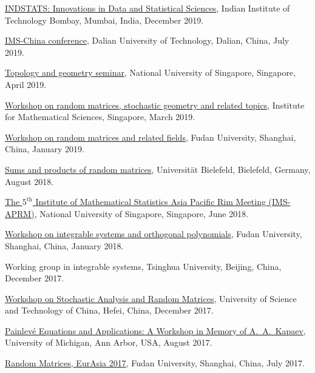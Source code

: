 \documentclass[12pt,a4paper]{article}
\newenvironment{item_list}{
 \begin{list}{}{
   \setlength{\leftmargin}{1.5em}
   \setlength{\itemsep}{0.25em}
   \setlength{\parskip}{0pt}
   \setlength{\parsep}{0.25em}
 }
}{
 \end{list}
}
\begin{document}
\begin{item_list}
\item
  \href{https://www.intindstat.org/iisaconference2019/}{INDSTATS: Innovations in Data and Statistical Sciences}, Indian Institute of Technology Bombay, Mumbai, India, December 2019.
\item
  \href{http://www.ims-china.org/}{IMS-China conference}, Dalian University of Technology, Dalian, China, July 2019.
\item
  \href{http://ww1.math.nus.edu.sg/seminars.aspx?CatID=5}{Topology and geometry seminar}, National University of Singapore, Singapore, April 2019.
\item
  \href{https://sites.google.com/view/randommatrices2019nus}{Workshop on random matrices, stochastic geometry and related topics}, Institute for Mathematical Sciences, Singapore, March 2019.
\item
  \href{http://math.fudan.edu.cn/show.aspx?info_lb=766&flag=527&info_id=6117}{Workshop on random matrices and related fields}, Fudan University, Shanghai, China, January 2019.
\item
  \href{https://www.uni-bielefeld.de/(en)/ZiF/AG/2018/08-27-Akemann.html}{Sums and products of random matrices}, Universit\"{a}t Bielefeld, Bielefeld, Germany, August 2018.
\item
  \href{https://ims-aprm2018.stat.nus.edu.sg/}{The $5^{\text{th}}$ Institute of Mathematical Statistics Asia Pacific Rim Meeting (IMS-APRM)}, National University of Singapore, Singapore, June 2018.
\item
  \href{http://math.fudan.edu.cn/en/Data/View/-99994362}{Workshop on integrable systems and orthogonal polynomials}, Fudan University, Shanghai, China, January 2018.
\item
  Working group in integrable systems, Tsinghua University, Beijing, China, December 2017.
\item
  \href{http://wulab.ustc.edu.cn/bencandy.php?fid=61&id=1688}{Workshop on Stochastic Analysis and Random Matrices}, University of Science and Technology of China, Hefei, China, December 2017.
\item
  \href{https://lsa.umich.edu/math/centers-outreach/mcaim/painleve-equations-workshop--august-25-29--2017.html}{Painlev\'{e} Equations and Applications: A Workshop in Memory of A.~A.~Kapaev}, University of Michigan, Ann Arbor, USA, August 2017.
\item
  \href{http://www.fst.umac.mo/en/staff/documents/yayangchen/Workshop%20on%20RMT17.pdf}{Random Matrices, EurAsia 2017}, Fudan University, Shanghai, China, July 2017.

\end{item_list}
\end{document}

